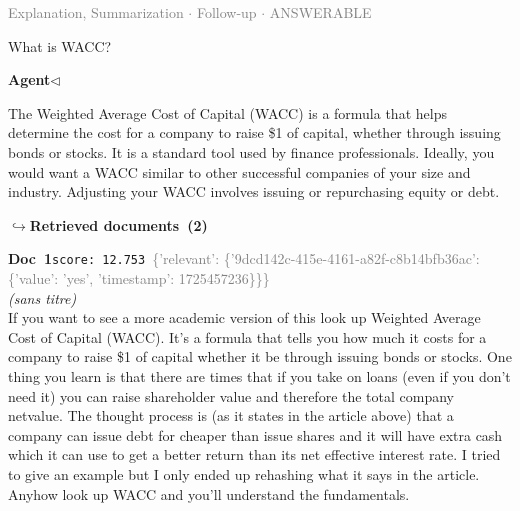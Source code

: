 \documentclass[a4paper,11pt]{article}
\begin{document}
\vspace{0.5em}
\hfill{\tiny\textcolor{gray}{Explanation, Summarization $\cdot$ Follow-up $\cdot$ ANSWERABLE}}
\begin{userbubble}
What is WACC?
\end{userbubble}
\noindent\hfill{\small\textcolor{agentcolor}{\textbf{Agent\enspace$\triangleleft$}}}
\begin{agentbubble}
The Weighted Average Cost of Capital (WACC) is a formula that helps determine the cost for a company to raise \$1 of capital, whether through issuing bonds or stocks. It is a standard tool used by finance professionals. Ideally, you would want a WACC similar to other successful companies of your size and industry. Adjusting your WACC involves issuing or repurchasing equity or debt.
\end{agentbubble}
\noindent\hfill{\footnotesize\textcolor{doccolor}{\textbf{$\hookrightarrow$\enspace Retrieved documents~(2)}}}
\begin{docenv}
{\footnotesize\textcolor{doccolor}{\textbf{Doc~1}}}\hfill{\tiny\texttt{score:~12.753}}\ {\tiny\textcolor{gray}{\{'relevant': \{'9dcd142c-415e-4161-a82f-c8b14bfb36ac': \{'value': 'yes', 'timestamp': 1725457236\}\}\}}}\\[3pt]
{\small\textit{(sans titre)}}\\[2pt]
\vspace{2pt}
{\footnotesize 
If you want to see a more academic version of this look up Weighted Average Cost of Capital (WACC).   It's a formula that tells you how much it costs for a company to raise \$1 of capital whether it be through issuing bonds or stocks.   One thing you learn is that there are times that if you take on loans (even if you don't need it) you can raise shareholder value and therefore the total company netvalue. The thought process is (as it states in the article above) that a company can issue debt for cheaper than issue shares and it will have extra cash which it can use to get a better return than its net effective interest rate.   I tried to give an example but I only ended up rehashing what it says in the article. Anyhow look up WACC and you'll understand the fundamentals.}
\end{docenv}
\end{document}

